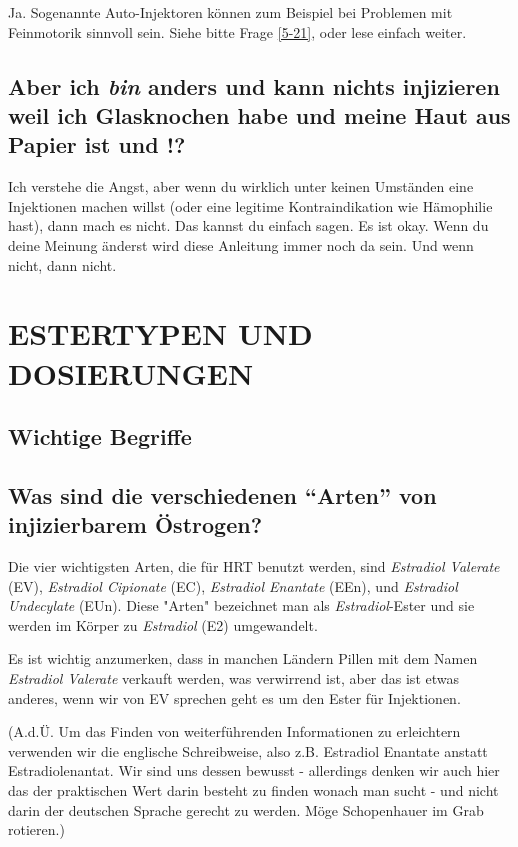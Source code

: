 \documentclass{article}
\begin{document}
Ja. Sogenannte Auto-Injektoren können zum Beispiel bei Problemen mit Feinmotorik sinnvoll sein. Siehe bitte Frage \ref{5-21}, oder lese einfach weiter.

\subsection{Aber ich \textit{bin} anders und kann nichts injizieren weil ich Glasknochen habe und meine Haut aus Papier ist und \textemdash{}!?}

Ich verstehe die Angst, aber wenn du wirklich unter keinen Umständen eine Injektionen machen willst (oder eine legitime Kontraindikation wie Hämophilie hast), dann mach es nicht. Das kannst du einfach sagen. Es ist okay. Wenn du deine Meinung änderst wird diese Anleitung immer noch da sein. Und wenn nicht, dann nicht. 

 

\section{ESTERTYPEN UND DOSIERUNGEN}\label{td}

\subsection*{Wichtige Begriffe}

\subsection{Was sind die verschiedenen “Arten” von injizierbarem Östrogen?}

Die vier wichtigsten Arten, die für HRT benutzt werden, sind \textit{Estradiol Valerate} (EV), \textit{Estradiol Cipionate} (EC), \textit{Estradiol Enantate} (EEn), und \textit{Estradiol Undecylate} (EUn). Diese "Arten" bezeichnet man als \textit{Estradiol}-Ester und sie werden im Körper zu \textit{Estradiol} (E2)  umgewandelt. 

Es ist wichtig anzumerken, dass in manchen Ländern Pillen mit dem Namen \textit{Estradiol Valerate} verkauft werden, was verwirrend ist, aber das ist etwas anderes, wenn wir von EV sprechen geht es um den Ester für Injektionen.

(A.d.Ü. Um das Finden von weiterführenden Informationen zu erleichtern verwenden wir die englische Schreibweise, also z.B. Estradiol Enantate anstatt Estradiolenantat. Wir sind uns dessen bewusst - allerdings denken wir auch hier das der praktischen Wert darin besteht zu finden wonach man sucht - und nicht darin der deutschen Sprache gerecht zu werden. Möge Schopenhauer im Grab rotieren.)
\end{document}
